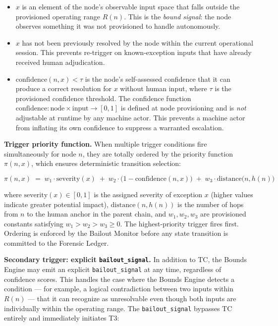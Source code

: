 \begin{itemize}\itemsep=0pt
\item[(i)] $x$ is an element of the node's observable input space that falls outside the provisioned operating range $R(n)$. This is the \emph{bound signal}: the node observes something it was not provisioned to handle autonomously.
\item[(ii)] $x$ has not been previously resolved by the node within the current operational session. This prevents re-trigger on known-exception inputs that have already received human adjudication.
\item[(iii)] $\text{confidence}(n, x) < \tau$ is the node's self-assessed confidence that it can produce a correct resolution for $x$ without human input, where $\tau$ is the provisioned confidence threshold. The confidence function $\text{confidence} : \text{node} \times \text{input} \rightarrow [0, 1]$ is defined at node provisioning and is \emph{not} adjustable at runtime by any machine actor. This prevents a machine actor from inflating its own confidence to suppress a warranted escalation.
\end{itemize}

\medskip\noindent\textbf{Trigger priority function.} When multiple trigger conditions fire simultaneously for node $n$, they are totally ordered by the priority function $\pi(n, x)$, which ensures deterministic transition selection:

\begin{equation}
\pi(n, x) \;=\; w_1 \cdot \text{severity}(x) \;+\; w_2 \cdot \bigl(1 - \text{confidence}(n, x)\bigr) \;+\; w_3 \cdot \text{distance}\bigl(n, h(n)\bigr) \tag{PF}
\end{equation}

where $\text{severity}(x) \in [0, 1]$ is the assigned severity of exception $x$ (higher values indicate greater potential impact), $\text{distance}(n, h(n))$ is the number of hops from $n$ to the human anchor in the parent chain, and $w_1, w_2, w_3$ are provisioned constants satisfying $w_1 > w_2 > w_3 \geq 0$. The highest-priority trigger fires first. Ordering is enforced by the Bailout Monitor before any state transition is committed to the Forensic Ledger.

\medskip\noindent\textbf{Secondary trigger: explicit \texttt{bailout\_signal}.} In addition to TC, the Bounds Engine may emit an explicit \texttt{bailout\_signal} at any time, regardless of confidence scores. This handles the case where the Bounds Engine detects a condition — for example, a logical contradiction between two inputs within $R(n)$ — that it can recognize as unresolvable even though both inputs are individually within the operating range. The \texttt{bailout\_signal} bypasses TC entirely and immediately initiates T3:

